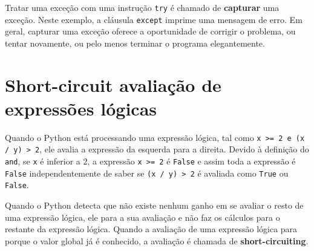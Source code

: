 Tratar uma exceção com uma instrução {\tt try} é chamado de {\bf capturar} uma
exceção.
Neste exemplo, a cláusula {\tt except} imprime uma mensagem de erro. Em geral,
capturar uma exceção oferece a oportunidade de corrigir o problema, ou tentar
novamente, ou pelo menos terminar o programa elegantemente.


\section{Short-circuit avaliação de expressões lógicas}


Quando o Python está processando uma expressão lógica, tal como
{\tt x >= 2 e (x / y) > 2}, ele avalia a expressão
da esquerda para a direita. Devido à definição do {\tt and},
se {\tt x} é inferior a 2, a expressão {\tt x >= 2} é
{\tt False} e assim toda a expressão é {\tt False} independentemente
de saber se {\tt (x / y) > 2} é avaliada como {\tt True} ou {\tt False}.


Quando o Python detecta que não existe nenhum ganho em se avaliar o 
resto de uma expressão lógica, ele para a sua avaliação e não 
faz os cálculos para o restante da expressão lógica.
Quando a avaliação de uma expressão lógica para porque o valor global já 
é conhecido, a avaliação é chamada de {\bf short-circuiting}.


